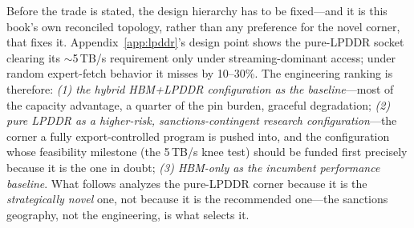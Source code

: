 Before the trade is stated, the design hierarchy has to be fixed---and it is this book's own reconciled topology, rather than any preference for the novel corner, that fixes it. Appendix~\ref{app:lpddr}'s design point shows the pure-LPDDR socket clearing its $\sim$5\,TB/s requirement only under streaming-dominant access; under random expert-fetch behavior it misses by 10--30\%. The engineering ranking is therefore: \emph{(1) the hybrid HBM+LPDDR configuration as the baseline}---most of the capacity advantage, a quarter of the pin burden, graceful degradation; \emph{(2) pure LPDDR as a higher-risk, sanctions-contingent research configuration}---the corner a fully export-controlled program is pushed into, and the configuration whose feasibility milestone (the 5\,TB/s knee test) should be funded first precisely because it is the one in doubt; \emph{(3) HBM-only as the incumbent performance baseline}. What follows analyzes the pure-LPDDR corner because it is the \emph{strategically novel} one, not because it is the recommended one---the sanctions geography, not the engineering, is what selects it.

